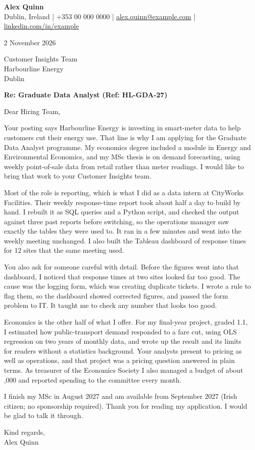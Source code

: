 \documentclass[11pt,a4paper]{article}
\begin{document}
{\Large\bfseries\color{accent} Alex Quinn}\\
Dublin, Ireland \;|\; +353 00 000 0000 \;|\; \href{mailto:alex.quinn@example.com}{alex.quinn@example.com} \;|\; \href{https://linkedin.com/in/example}{linkedin.com/in/example}

\vspace{10pt}
2 November 2026

Customer Insights Team\\
Harbourline Energy\\
Dublin

\textbf{Re: Graduate Data Analyst (Ref: HL-GDA-27)}

Dear Hiring Team,

Your posting says Harbourline Energy is investing in smart-meter data to help customers cut their energy use. That line is why I am applying for the Graduate Data Analyst programme. My economics degree included a module in Energy and Environmental Economics, and my MSc thesis is on demand forecasting, using weekly point-of-sale data from retail rather than meter readings. I would like to bring that work to your Customer Insights team.

Most of the role is reporting, which is what I did as a data intern at CityWorks Facilities. Their weekly response-time report took about half a day to build by hand. I rebuilt it as SQL queries and a Python script, and checked the output against three past reports before switching, so the operations manager saw exactly the tables they were used to. It ran in a few minutes and went into the weekly meeting unchanged. I also built the Tableau dashboard of response times for 12 sites that the same meeting used.

You also ask for someone careful with detail. Before the figures went into that dashboard, I noticed that response times at two sites looked far too good. The cause was the logging form, which was creating duplicate tickets. I wrote a rule to flag them, so the dashboard showed corrected figures, and passed the form problem to IT. It taught me to check any number that looks too good.

Economics is the other half of what I offer. For my final-year project, graded 1.1, I estimated how public-transport demand responded to a fare cut, using OLS regression on two years of monthly data, and wrote up the result and its limits for readers without a statistics background. Your analysts present to pricing as well as operations, and that project was a pricing question answered in plain terms. As treasurer of the Economics Society I also managed a budget of about ,000 and reported spending to the committee every month.

I finish my MSc in August 2027 and am available from September 2027 (Irish citizen; no sponsorship required). Thank you for reading my application. I would be glad to talk it through.

Kind regards,\\
Alex Quinn
\end{document}
